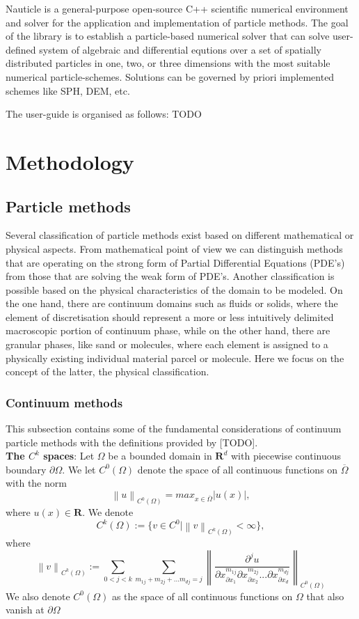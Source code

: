 \documentclass[a4paper,12pt,openany]{book}
\newcommand*{\SET}[1]  {\ensuremath{\mathbf{#1}}}
\newcommand{\R}{\SET{R}}
\newcommand{\norm}[1]{\left\lVert#1\right\rVert}
\theoremstyle{break}
\begin{document}
Nauticle is a general-purpose open-source C++ scientific numerical environment and solver for the application and implementation of particle methods. The goal of the library is to  establish a particle-based numerical solver that can solve user-defined system of algebraic and differential equtions over a set of spatially distributed particles in one, two, or three dimensions with the most suitable numerical particle-schemes. Solutions can be governed by priori implemented schemes like SPH, DEM, etc. 

The user-guide is organised as follows: TODO

\section{Methodology}
\subsection{Particle methods}
Several classification of particle methods exist based on different mathematical or physical aspects. From mathematical point of view we can distinguish methods that are operating on the strong form of Partial Differential Equations (PDE's) from those that are solving the weak form of PDE's. Another classification is possible based on the physical characteristics of the domain to be modeled. On the one hand, there are continuum domains such as fluids or solids, where the element of discretisation should represent a more or less intuitively delimited macroscopic portion of continuum phase, while on the other hand, there are granular phases, like sand or molecules, where each element is assigned to a physically existing individual material parcel or molecule. Here we focus on the concept of the latter, the physical classification.
\subsubsection{Continuum methods}
This subsection contains some of the fundamental considerations of continuum particle methods with the definitions provided by [TODO]. \\

\textbf{The $C^k$ spaces}: Let $\Omega$ be a bounded domain in $\R^d$ with piecewise continuous boundary $\partial\Omega$. We let $C^0(\Omega)$ denote the space of all continuous functions on $\overline{\Omega}$ with the norm
\begin{equation}
\norm{u}_{C^0(\Omega)}=max_{x\in\overline{\Omega}}|u(x)|,
\end{equation}
where $u(x)\in\R$. We denote
\begin{equation}
C^k(\Omega):=\{v\in C^0\vert\norm{v}_{C^k (\Omega)}<\infty\},
\end{equation}
where
\begin{equation}
\norm{v}_{C^k (\Omega)}:=\sum_{0<j<k}\sum_{m_{1j}+m_{2j}+...m_{dj}=j}\norm{\frac{\partial^j u}{\partial x^{m_{1j}}_{\partial x_1}\partial x^{m_{2j}}_{\partial x_2}...\partial x^{m_{dj}}_{\partial x_d}}}_{C^0(\Omega)}
\end{equation}
We also denote $C^0(\Omega)$ as the space of all continuous functions on $\Omega$ that also vanish at $\partial\Omega$
\end{document}
